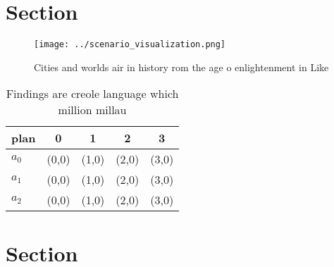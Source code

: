 \documentclass[a4paper]{article}
\begin{document}
\section{Section}

\begin{figure}
\centering
\texttt{[image: ../scenario\_visualization.png]}
\caption{Cities and worlds air in history rom the age o enlightenment in Like 
}
\end{figure}
 
\begin{table}
\begin{adjustbox}{width=0.6\columnwidth}
\begin{tabular}{|l|l|l|l|l|}
\hline
\textbf{plan} & \multicolumn{1}{c|}{\textbf{0}} & \multicolumn{1}{c|}{\textbf{1}} & \multicolumn{1}{c|}{\textbf{2}} & \multicolumn{1}{c|}{\textbf{3}} \\ \hline
\textbf{$a_0$}  & (0,0) & (1,0) & (2,0) & (3,0) \\ \hline
\textbf{$a_1$}  & (0,0) & (1,0) & (2,0) & (3,0) \\ \hline
\textbf{$a_2$}  & (0,0) & (1,0) & (2,0) & (3,0) \\ \hline
\end{tabular}
\end{adjustbox}
\caption{Findings are creole language which million millau
}
\end{table}

\section{Section}
\end{document}
